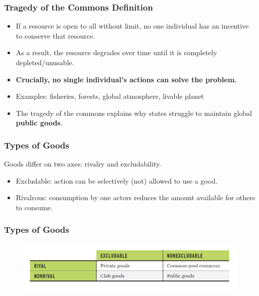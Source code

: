 \documentclass[handout]{beamer}
\begin{document}
\begin{frame} 
	\frametitle{\LARGE{Tragedy of the Commons Definition}}
	\begin{itemize}
		\item If a resource is open to all without limit, no one individual has an incentive to conserve that resource. \pause
		
		\item As a result, the resource degrades over time until it is completely depleted/unusable. \pause 
		\item \textbf{Crucially, no single individual's actions can solve the problem.} \pause 
		
		\item Examples: \pause fisheries, forests, global atmosphere, livable planet \pause
		
		\item The tragedy of the commons explains why states struggle to maintain global \textbf{public goods}.
	\end{itemize}
\end{frame}

\begin{frame} 
	\frametitle{\LARGE{Types of Goods}}
	Goods differ on two axes: rivalry and excludability.
	\begin{itemize}
		
		\item Excludable: action can be selectively (not) allowed to use a good. \pause
		
		\item Rivalrous: consumption by one actors reduces the amount available for others to consume. 
	\end{itemize}
\end{frame}

\begin{frame} 
	\frametitle{\LARGE{Types of Goods}}
	\begin{figure}[ht!]
		\centering
		\includegraphics[width=\textwidth,height=0.8\textheight, keepaspectratio]{./goods.png}
	\end{figure}
\end{frame}
\end{document}
